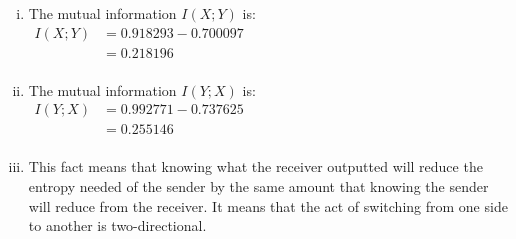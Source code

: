 \documentclass[letterpaper,notitlepage,twoside]{article}
\begin{document}
\begin{enumerate}[(i)]
\item The mutual information $I(X ; Y)$ is: \\
$\begin{aligned}
I(X;Y) &= 0.918293 - 0.700097 \\ 
&= 0.218196 \\
\end{aligned}$

\item The mutual information $I(Y ; X)$ is: \\
$\begin{aligned}
I(Y;X) &= 0.992771 - 0.737625 \\
&= 0.255146 \\
\end{aligned}$

\item This fact means that knowing what the receiver outputted will reduce the entropy needed of the sender by the same amount that knowing the sender will reduce from the receiver. It means that the act of switching from one side to another is two-directional.

\end{enumerate}
\end{document}
